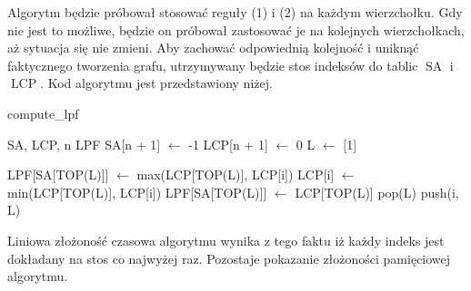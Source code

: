 \documentclass[a4paper,12pt]{article}
\theoremstyle{definition}
\DeclareMathOperator{\SA}{SA}
\DeclareMathOperator{\LCP}{LCP}
\begin{document}
Algorytm będzie próbował stosować reguły (1) i (2) na każdym wierzchołku.
Gdy nie jest to możliwe, będzie on próbował zastosować je na kolejnych wierzchołkach,
 aż sytuacja się nie zmieni.
Aby zachować odpowiednią kolejność i uniknąć faktycznego tworzenia grafu,
 utrzymywany będzie stos indeksów do tablic $\SA$ i $\LCP$.
Kod algorytmu jest przedstawiony niżej.

\begin{algorithm}
\caption{compute\_lpf}
\begin{algorithmic}
\REQUIRE SA, LCP, n
\ENSURE LPF
\STATE SA[n + 1] $\gets$ -1
\STATE LCP[n + 1] $\gets$ 0
\STATE L $\gets$ [1]

\STATE LPF[SA[TOP(L)]] $\gets$ max(LCP[TOP(L)], LCP[i])
\STATE LCP[i] $\gets$ min(LCP[TOP(L)], LCP[i])
\ELSE
\STATE LPF[SA[TOP(L)]] $\gets$ LCP[TOP(L)]
\ENDIF
\STATE pop(L)
\ENDWHILE
{}
\STATE push(i, L)
\ENDIF
\ENDFOR
\end{algorithmic}
\end{algorithm}

Liniowa złożoność czasowa algorytmu wynika z tego faktu iż każdy indeks jest dokładany na stos co najwyżej raz.
Pozostaje pokazanie złożoności pamięciowej algorytmu.
\end{document}
